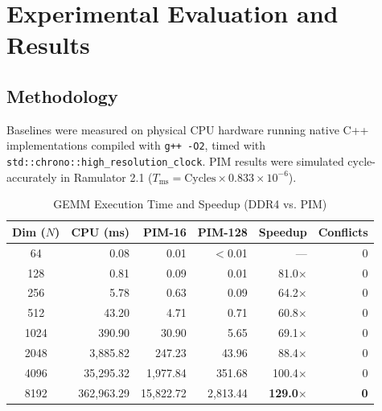 \documentclass[10pt,twocolumn]{article}
\begin{document}
\section{Experimental Evaluation and Results}
\label{sec:results}

\subsection{Methodology}
Baselines were measured on physical CPU hardware running native C++ implementations compiled with \texttt{g++ -O2}, timed with \texttt{std::chrono::high_resolution_clock}. PIM results were simulated cycle-accurately in Ramulator 2.1 ($T_{\text{ms}} = \text{Cycles} \times 0.833 \times 10^{-6}$).

\begin{table}[t]
\centering
\footnotesize
\caption{GEMM Execution Time and Speedup (DDR4 vs. PIM)}
\label{tab:gemm}
\begin{tabular}{crrrrr}
\toprule
\textbf{Dim ($N$)} & \textbf{CPU (ms)} & \textbf{PIM-16} & \textbf{PIM-128} & \textbf{Speedup} & \textbf{Conflicts} \\
\midrule
64   &       0.08 &      0.01 &   $<$0.01 &        --- & 0 \\
128  &       0.81 &      0.09 &      0.01 &  81.0$\times$ & 0 \\
256  &       5.78 &      0.63 &      0.09 &  64.2$\times$ & 0 \\
512  &      43.20 &      4.71 &      0.71 &  60.8$\times$ & 0 \\
1024 &     390.90 &     30.90 &      5.65 &  69.1$\times$ & 0 \\
2048 &   3,885.82 &    247.23 &     43.96 &  88.4$\times$ & 0 \\
4096 &  35,295.32 &  1,977.84 &    351.68 & 100.4$\times$ & 0 \\
8192 & 362,963.29 & 15,822.72 &  2,813.44 & \textbf{129.0$\times$} & \textbf{0} \\
\bottomrule
\end{tabular}
\end{table}
\end{document}
